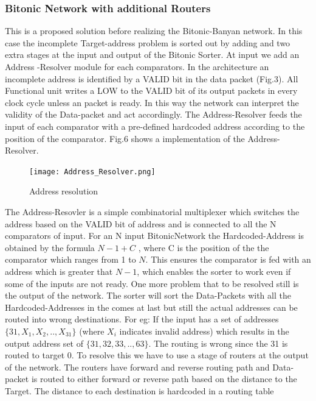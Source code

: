 \documentclass[adraft]{eptcs}
\begin{document}
				  \subsubsection{Bitonic Network with additional Routers}
					      This is a proposed solution before realizing the Bitonic-Banyan network. In this case the incomplete Target-address problem is sorted out by adding and two extra stages at the input and output of the Bitonic Sorter. At input we add an Address
					      -Resolver module for each comparators. In the architecture an incomplete address is identified by a VALID bit in the data packet (Fig.3). All Functional unit writes a 
					      LOW to the VALID bit of its output packets in every clock cycle unless an packet is ready. In this way the network can interpret the validity of the Data-packet and act accordingly.
					      The Address-Resolver feeds the input of each comparator with a pre-defined hardcoded address according to the position of the comparator. Fig.6 shows a implementation of the
					      Address-Resolver.
					      \begin{figure}[!ht]
							\texttt{[image: Address\_Resolver.png]}
						      \caption{Address resolution}
					      \end{figure}
					      The Address-Resovler is a simple combinatorial multiplexer which switches the address based on the VALID bit of address and is connected to all the N comparators of input.
					      For an N input BitonicNetwork the Hardcoded-Address is obtained by the formula $N -1 + C$ , where C is the position of the the comparator which ranges from 1 to $N$. This ensures the 
					      comparator is fed with an address which is greater that $N -1$, which enables the sorter to work even if some of the inputs are not ready. One more problem that to be resolved
					      still is the output of the network. The sorter will sort the Data-Packets with all the Hardcoded-Addresses in the comes at last but still the actual addresses can
					      be routed into wrong destinations. For eg: If the input has a set of addresses $\{31,X_{1},X_{2},..,X_{31}\}$ (where $X_{i}$ indicates invalid address) which results in the output address set of $\{31,32,33,..,63\}$.
					      The routing is wrong since the 31 is routed to target 0. To resolve this we have to use a stage of routers at the output of the network. The routers have forward and reverse
					      routing path and Data-packet is routed to either forward or reverse path based on the distance to the Target. The distance to each destination is hardcoded in a routing table
\end{document}

